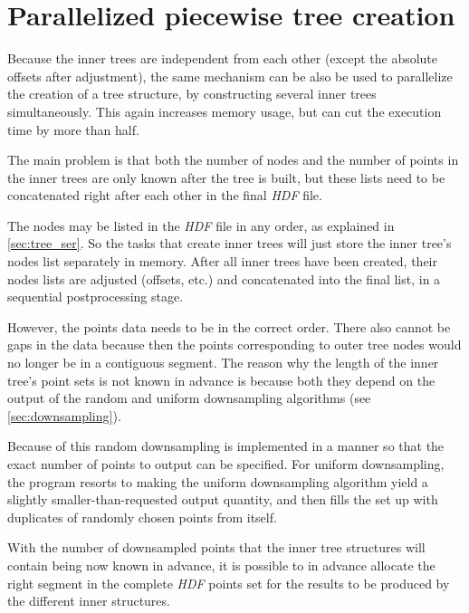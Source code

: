 \documentclass[a4paper,10pt,abstracton,notitlepage]{scrreprt}
\begin{document}
\section{Parallelized piecewise tree creation}
Because the inner trees are independent from each other (except the absolute offsets after adjustment), the same mechanism can be also be used to parallelize the creation of a tree structure, by constructing several inner trees simultaneously. This again increases memory usage, but can cut the execution time by more than half.

The main problem is that both the number of nodes and the number of points in the inner trees are only known after the tree is built, but these lists need to be concatenated right after each other in the final \emph{HDF} file.

The nodes may be listed in the \emph{HDF} file in any order, as explained in \ref{sec:tree_ser}. So the tasks that create inner trees will just store the inner tree's nodes list separately in memory. After all inner trees have been created, their nodes lists are adjusted (offsets, etc.) and concatenated into the final list, in a sequential postprocessing stage.

However, the points data needs to be in the correct order. There also cannot be gaps in the data because then the points corresponding to outer tree nodes would no longer be in a contiguous segment. The reason why the length of the inner tree's point sets is not known in advance is because both they depend on the output of the random and uniform downsampling algorithms (see \ref{sec:downsampling}).

Because of this random downsampling is implemented in a manner so that the exact number of points to output can be specified. For uniform downsampling, the program resorts to making the uniform downsampling algorithm yield a slightly smaller-than-requested output quantity, and then fills the set up with duplicates of randomly chosen points from itself.

With the number of downsampled points that the inner tree structures will contain being now known in advance, it is possible to in advance allocate the right segment in the complete \emph{HDF} points set for the results to be produced by the different inner structures.
\end{document}
